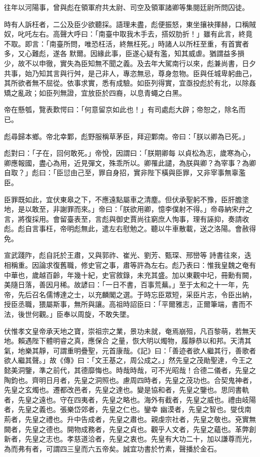 \begin{pinyinscope}
 往年以河陽事，曾與彪在領軍府共太尉、司空及領軍諸卿等集閱廷尉所問囚徒。



 時有人訴枉者，二公及臣少欲聽採。語理未盡，彪便振怒，東坐攘袂揮赫，口稱賊奴，叱吒左右。高聲大呼曰：「南臺中取我木手去，搭奴肋折！」雖有此言，終竟不取。即言：「南臺所問，唯恐枉活，終無枉死。」時諸人以所枉至重，有首實者多，又心難彪，遂各
 默爾。因緣此事，臣遂心疑有濫，知其威虐。猶謂益多損少，故不以申徹，實失為臣知無不聞之義。及去年大駕南行以來，彪兼尚書，日夕共事，始乃知其言與行舛，是己非人，專恣無忌，尊身忽物。臣與任城卑躬曲己，其所欲者無不屈從。依事求實，悉有成驗。如臣列得實，宜亟投彪於有北，以除姦矯之亂政；如臣列無證，宜放臣於四裔，以息青蠅之白黑。



 帝在懸瓠，覽表歎愕曰：「何意留京如此也！」有司處彪大辟；帝恕之，除名而已。



 彪尋歸本鄉。帝北幸鄴，彪野服稱草茅臣，拜迎鄴南。帝曰：「朕以卿為已死。」



 彪對曰：「子在，回何敢死。」帝悅，因謂曰：「朕期卿每
 以貞松為志，歲寒為心，卿應報國，盡心為用，近見彈文，殊乖所以。卿罹此譴，為朕與卿？為宰事？為卿自取？」彪曰：「臣愆由己至，罪自身招，實非陛下橫與臣罪，又非宰事無辜濫臣。



 臣罪既如此，宜伏東皋之下，不應遠點屬車之清塵。但伏承聖躬不豫，臣肝膽塗地，是以敢至，非謝罪而來。」帝曰：「朕欲用卿，憶李僕射不得。」帝尋納宋弁之言，將復採用。會留臺表至，言彪與御史賈尚往窮庶人恂事，理有誣抑，奏請收彪。彪自言事枉，帝明彪無此，遣左右慰勉之。聽以牛車散載，送之洛陽。會赦得免。



 宣武踐阼，彪自託於王肅，又與郭祚、崔光、劉芳、甄琛、邢巒等
 詩書往來，迭相稱重。因論求復舊職，修史官之事，肅等許為左右。彪乃表曰：惟我皇魏之奄有中華也，歲越百齡，年幾十紀，史官敘錄，未充其盛。加以東觀中圮，冊勳有闕，美隨日落，善因月稀。故諺曰：「一日不書，百事荒蕪。」至于太和之十一年，先帝，先后召名儒博達之士，以充麟閣之選。于時忘臣眾短，采臣片志，令臣出納，授臣丞職，猥屬斯事，無所與讓。高祖時詔臣曰：「平爾雅志，正爾筆端，書而不法，後世何觀。」臣奉以周旋，不敢失墜。



 伏惟孝文皇帝承天地之寶，崇祖宗之業，景功未就，奄焉崩殂，凡百黎萌，若無天地。賴遇陛下體明睿之真，應保合
 之量，恢大明以燭物，履靜恭以和邦。天清其氣，地樂其靜，可謂重明疊聖，元首康哉。《記》曰：「善迹者欲人繼其行，善歌者欲人繼其聲。」故《傳》曰：「文王基之，周公成之。」然先皇之茂勛聖達，今王之懿美洞鑒，準之前代，其德靡悔也。時哉時哉，可不光昭哉！合德二儀者，先皇之陶鈞也。齊明日月者，先皇之洞照也。慮周四時者，先皇之茂功也。合契鬼神者，先皇之玄燭也。遷都改邑者，先皇之達也。變是協和者，先皇之鑒也。思同書軌者，先皇之遠也。守在四夷者，先皇之略也。海外有截者，先皇之威也。禮由岐陽者，先皇之義也。張樂岱郊者，先皇之仁也。鑾幸
 幽漠者，先皇之智也。燮伐南荊者，先皇之禮也。升中告成者，先皇之肅也。親虔宗社者，先皇之敬也。兗實無闕者，先皇之德也。開物成務者，先皇之貞也。觀乎人文者，先皇之蘊也。革弊創新者，先皇之志也。孝慈道洽者，先皇之衷也。先皇有大功二十，加以謙尊而光，為而弗有者，可謂四三皇而六五帝矣。誠宜功書於竹素，聲播於金石。




\end{pinyinscope}
